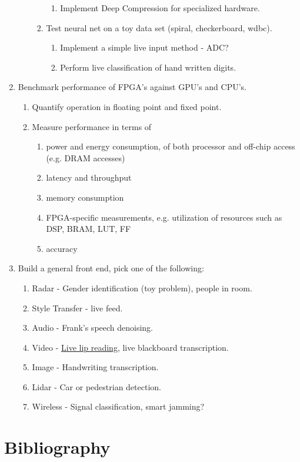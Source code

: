 \documentclass[12pt]{article}
\begin{document}
\begin{enumerate}
\begin{enumerate}
\begin{enumerate}
\begin{enumerate}
            \item Implement Deep Compression for specialized hardware. \citet{DBLP:journals/corr/HanMD15}
          \end{enumerate}
        \item Test neural net on a toy data set (spiral, checkerboard, wdbc).\
          \begin{enumerate}
            \item Implement a simple live input method - ADC?
            \item Perform live classification of hand written digits.
          \end{enumerate}
      \end{enumerate}
    \end{enumerate}
  \item Benchmark performance of FPGA's against GPU's and CPU's.
    \begin{enumerate}
      \item Quantify operation in floating point and fixed point.
      \item Measure performance in terms of 
          \begin{enumerate}
              \item power and energy consumption, of both processor and off-chip access (e.g. DRAM accesses)
              \item latency and throughput
              \item memory consumption
              \item FPGA-specific measurements, e.g. utilization of resources such as DSP, BRAM,  LUT, FF
              \item accuracy
          \end{enumerate}
    \end{enumerate}
  \item Build a general front end, pick one of the following:
    \begin{enumerate}
      \item Radar - Gender identification (toy problem), people in room.
      \item Style Transfer - live feed.
      \item Audio - Frank's speech denoising.
      \item Video - \href{https://arxiv.org/pdf/1611.01599.pdf}{Live lip reading}, live 
        blackboard transcription.
      \item Image - Handwriting transcription.
      \item Lidar - Car or pedestrian detection.
      \item Wireless - Signal classification, smart jamming?
    \end{enumerate}
  \end{enumerate}
\section{Bibliography}


\end{document}
